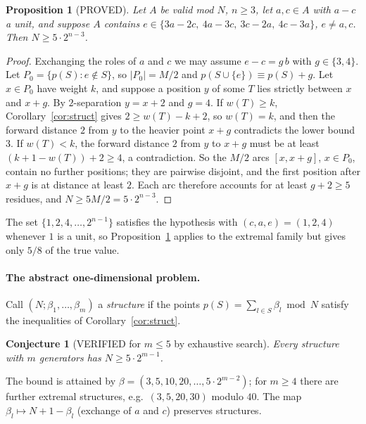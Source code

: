 \documentclass[11pt]{article}
\newtheorem{proposition}[theorem]{Proposition}
\newtheorem{conjecture}[theorem]{Conjecture}
\theoremstyle{definition}
\begin{document}
\begin{proposition}[PROVED]\label{prop:small}
Let $A$ be valid mod $N$, $n\ge3$, let $a,c\in A$ with $a-c$ a unit, and suppose $A$ contains $e\in\{3a-2c,\ 4a-3c,\ 3c-2a,\ 4c-3a\}$, $e\ne a,c$. Then $N\ge 5\cdot 2^{n-3}$.
\end{proposition}
\begin{proof}
Exchanging the roles of $a$ and $c$ we may assume $e-c=g\,b$ with $g\in\{3,4\}$. Let $P_0=\{p(S):e\notin S\}$, so $|P_0|=M/2$ and $p(S\cup\{e\})\equiv p(S)+g$. Let $x\in P_0$ have weight $k$, and suppose a position $y$ of some $T$ lies strictly between $x$ and $x+g$. By $2$-separation $y=x+2$ and $g=4$. If $w(T)\ge k$, Corollary~\ref{cor:struct} gives $2\ge w(T)-k+2$, so $w(T)=k$, and then the forward distance $2$ from $y$ to the heavier point $x+g$ contradicts the lower bound $3$. If $w(T)<k$, the forward distance $2$ from $y$ to $x+g$ must be at least $(k+1-w(T))+2\ge4$, a contradiction. So the $M/2$ arcs $[x,x+g]$, $x\in P_0$, contain no further positions; they are pairwise disjoint, and the first position after $x+g$ is at distance at least $2$. Each arc therefore accounts for at least $g+2\ge5$ residues, and $N\ge 5M/2=5\cdot 2^{n-3}$.
\end{proof}
The set $\{1,2,4,\dots,2^{n-1}\}$ satisfies the hypothesis with $(c,a,e)=(1,2,4)$ whenever $1$ is a unit, so Proposition~\ref{prop:small} applies to the extremal family but gives only $5/8$ of the true value.

\paragraph{The abstract one-dimensional problem.} Call $(N;\beta_1,\dots,\beta_m)$ a \emph{structure} if the points $p(S)=\sum_{l\in S}\beta_l \bmod N$ satisfy the inequalities of Corollary~\ref{cor:struct}.
\begin{conjecture}[VERIFIED for $m\le5$ by exhaustive search]\label{conj:1d}
Every structure with $m$ generators has $N\ge 5\cdot 2^{m-1}$.
\end{conjecture}
The bound is attained by $\beta=(3,5,10,20,\dots,5\cdot2^{m-2})$; for $m\ge4$ there are further extremal structures, e.g.\ $(3,5,20,30)$ modulo $40$. The map $\beta_l\mapsto N+1-\beta_l$ (exchange of $a$ and $c$) preserves structures.
\end{document}
